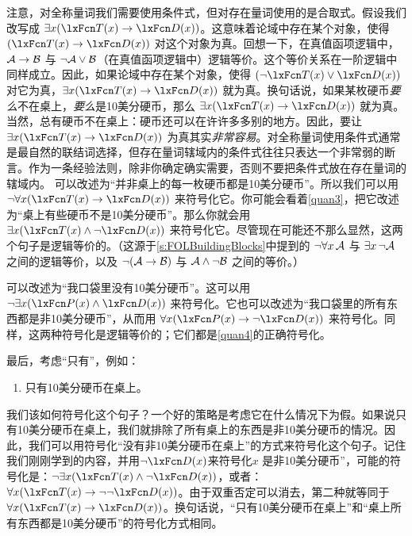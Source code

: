 注意，对全称量词我们需要使用条件式，但对存在量词使用的是合取式。假设我们改写成 $\exists x(\atom{T}{x} \eif \atom{D}{x})$。这意味着论域中存在某个对象，使得 $(\atom{T}{x} \eif \atom{D}{x})$ 对这个对象为真。回想一下，在真值函项逻辑中，$\mathcal{A} \rightarrow \mathcal{B}$ 与 $\neg\mathcal{A} \vee \mathcal{B}$（在真值函项逻辑中）逻辑等价。这个等价关系在一阶逻辑中同样成立。因此，如果论域中存在某个对象，使得 $(\enot \atom{T}{x} \eor \atom{D}{x})$ 对它为真，$\exists x(\atom{T}{x} \eif \atom{D}{x})$ 就为真。换句话说，如果某枚硬币\emph{要么}不在桌上，\emph{要么}是10美分硬币，那么 $\exists x (\atom{T}{x} \eif \atom{D}{x})$ 就为真。当然，总有硬币不在桌上：硬币还可以在许许多多别的地方。因此，要让 $\exists x(\atom{T}{x} \eif \atom{D}{x})$ 为真其实\emph{非常容易}。对全称量词使用条件式通常是最自然的联结词选择，但存在量词辖域内的条件式往往只表达一个非常弱的断言。作为一条经验法则，除非你确定确实需要，否则不要把条件式放在存在量词的辖域内。
可以改述为“并非桌上的每一枚硬币都是10美分硬币”。所以我们可以用 $\enot \forall x(\atom{T}{x} \eif \atom{D}{x})$ 来符号化它。你可能会看着\cref*{quan3}，把它改述为“桌上有些硬币不是10美分硬币”。那么你就会用 $\exists x(\atom{T}{x} \eand \enot \atom{D}{x})$ 来符号化它。尽管现在可能还不那么显然，这两个句子是逻辑等价的。（这源于\cref{s:FOLBuildingBlocks}中提到的 $\neg\forall x\,\mathcal{A}$ 与 $\exists x\,\neg\mathcal{A}$ 之间的逻辑等价，以及 $\neg(\mathcal{A}\rightarrow\mathcal{B})$ 与 $\mathcal{A}\wedge\neg\mathcal{B}$ 之间的等价。）

可以改述为“我口袋里没有10美分硬币”。这可以用 $\enot\exists x(\atom{P}{x} \eand \atom{D}{x})$ 来符号化。它也可以改述为“我口袋里的所有东西都是非10美分硬币”，从而用 $\forall x(\atom{P}{x} \eif \enot \atom{D}{x})$ 来符号化。同样，这两种符号化是逻辑等价的；它们都是\cref*{quan4}的正确符号化。


最后，考虑“只有”，例如：


\begin{enumerate}
	\item\label{quan5} 只有10美分硬币在桌上。
\end{enumerate}


我们该如何符号化这个句子？一个好的策略是考虑它在什么情况下为假。如果说只有10美分硬币在桌上，我们就排除了所有桌上的东西是非10美分硬币的情况。因此，我们可以用符号化“没有非10美分硬币在桌上”的方式来符号化这个句子。记住我们刚刚学到的内容，并用$\enot \atom{D}{x}$来符号化$x$ 是非10美分硬币”，可能的符号化是：$\enot\exists x(\atom{T}{x} \eand \enot \atom{D}{x})$，或者：$\forall x(\atom{T}{x} \eif \enot\enot \atom{D}{x})$。由于双重否定可以消去，第二种就等同于 $\forall x(\atom{T}{x} \eif \atom{D}{x})$。换句话说，“只有10美分硬币在桌上”和“桌上所有东西都是10美分硬币”的符号化方式相同。

